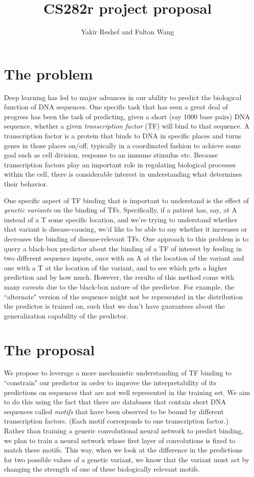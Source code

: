 \documentclass[11pt]{amsart}
\title{CS282r project proposal}
\author{Yakir Reshef and Fulton Wang}
\begin{document}
\maketitle
\section{The problem}
Deep learning has led to major advances in our ability to predict the biological function of DNA sequences. One specific task that has seen a great deal of progress has been the task of predicting, given a short (say 1000 base pairs) DNA sequence, whether a given {\em transcription factor} (TF) will bind to that sequence. A transcription factor is a protein that binds to DNA in specific places and turns genes in those places on/off, typically in a coordinated fashion to achieve some goal such as cell division, response to an immune stimulus etc. Because transcription factors play an important role in regulating biological processes within the cell, there is considerable interest in understanding what determines their behavior.

One specific aspect of TF binding that is important to understand is the effect of {\em genetic variants} on the binding of TFs. Specifically, if a patient has, say, at A instead of a T some specific location, and we're trying to understand whether that variant is disease-causing, we'd like to be able to say whether it increases or decreases the binding of disease-relevant TFs. One approach to this problem is to query a black-box predictor about the binding of a TF of interest by feeding in two different sequence inputs, once with an A at the location of the variant and one with a T at the location of the variant, and to see which gets a higher prediction and by how much. However, the results of this method come with many caveats due to the black-box nature of the predictor. For example, the ``alternate" version of the sequence might not be represented in the distribution the predictor is trained on, such that we don't have guarantees about the generalization capability of the predictor.

\section{The proposal}
We propose to leverage a more mechanistic understanding of TF binding to ``constrain" our predictor in order to improve the interpretability of its predictions on sequences that are not well represented in the training set. We aim to do this using the fact that there are databases that contain short DNA sequences called {\em motifs} that have been observed to be bound by different transcription factors. (Each motif corresponds to one transcription factor.) Rather than training a generic convolutional neural network to predict binding, we plan to train a neural network whose first layer of convolutions is fixed to match these motifs. This way, when we look at the difference in the predictions for two possible values of a genetic variant, we know that the variant must act by changing the strength of one of these biologically relevant motifs.
\end{document}
